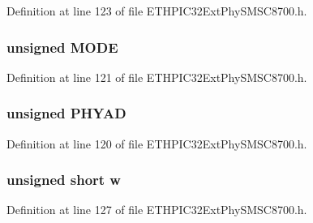 Definition at line 123 of file E\+T\+H\+P\+I\+C32\+Ext\+Phy\+S\+M\+S\+C8700.\+h.

\hypertarget{union_____s_p_e_c_i_a_l_m_o_d_ebits__t_adc56ba18ff3f1599c85d222bee624424}{}
\subsubsection[{M\+O\+D\+E}]{\setlength{\rightskip}{0pt plus 5cm}unsigned M\+O\+D\+E}\label{union_____s_p_e_c_i_a_l_m_o_d_ebits__t_adc56ba18ff3f1599c85d222bee624424}


Definition at line 121 of file E\+T\+H\+P\+I\+C32\+Ext\+Phy\+S\+M\+S\+C8700.\+h.

\hypertarget{union_____s_p_e_c_i_a_l_m_o_d_ebits__t_ad7512c2f25e7ba0954f5da603b8d1997}{}
\subsubsection[{P\+H\+Y\+A\+D}]{\setlength{\rightskip}{0pt plus 5cm}unsigned P\+H\+Y\+A\+D}\label{union_____s_p_e_c_i_a_l_m_o_d_ebits__t_ad7512c2f25e7ba0954f5da603b8d1997}


Definition at line 120 of file E\+T\+H\+P\+I\+C32\+Ext\+Phy\+S\+M\+S\+C8700.\+h.

\hypertarget{union_____s_p_e_c_i_a_l_m_o_d_ebits__t_a160850a4684a3e82c2323033964f2e98}{}
\subsubsection[{w}]{\setlength{\rightskip}{0pt plus 5cm}unsigned short w}\label{union_____s_p_e_c_i_a_l_m_o_d_ebits__t_a160850a4684a3e82c2323033964f2e98}


Definition at line 127 of file E\+T\+H\+P\+I\+C32\+Ext\+Phy\+S\+M\+S\+C8700.\+h.



